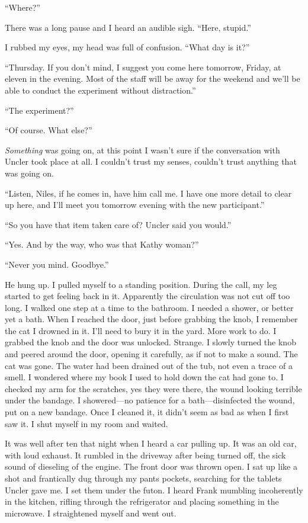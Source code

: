 \documentclass[
]{article}
\begin{document}
``Where?''

There was a long pause and I heard an audible sigh. ``Here, stupid.''

I rubbed my eyes, my head was full of confusion. ``What day is it?''

``Thursday. If you don't mind, I suggest you come here tomorrow, Friday,
at eleven in the evening. Most of the staff will be away for the weekend
and we'll be able to conduct the experiment without distraction.''

``The experiment?''

``Of course. What else?''

\emph{Something} was going on, at this point I wasn't sure if the
conversation with Uncler took place at all. I couldn't trust my senses,
couldn't trust anything that was going on.

``Listen, Niles, if he comes in, have him call me. I have one more
detail to clear up here, and I'll meet you tomorrow evening with the new
participant.''

``So you have that item taken care of? Uncler said you would.''

``Yes. And by the way, who was that Kathy woman?''

``Never you mind. Goodbye.''

He hung up. I pulled myself to a standing position. During the call, my
leg started to get feeling back in it. Apparently the circulation was
not cut off too long. I walked one step at a time to the bathroom. I
needed a shower, or better yet a bath. When I reached the door, just
before grabbing the knob, I remember the cat I drowned in it. I'll need
to bury it in the yard. More work to do. I grabbed the knob and the door
was unlocked. Strange. I slowly turned the knob and peered around the
door, opening it carefully, as if not to make a sound. The cat was gone.
The water had been drained out of the tub, not even a trace of a smell.
I wondered where my book I used to hold down the cat had gone to. I
checked my arm for the scratches, yes they were there, the wound looking
terrible under the bandage. I showered---no patience for a
bath---disinfected the wound, put on a new bandage. Once I cleaned it,
it didn't seem as bad as when I first saw it. I shut myself in my room
and waited.

It was well after ten that night when I heard a car pulling up. It was
an old car, with loud exhaust. It rumbled in the driveway after being
turned off, the sick sound of dieseling of the engine. The front door
was thrown open. I sat up like a shot and frantically dug through my
pants pockets, searching for the tablets Uncler gave me. I set them
under the futon. I heard Frank mumbling incoherently in the kitchen,
rifling through the refrigerator and placing something in the microwave.
I straightened myself and went out.
\end{document}
